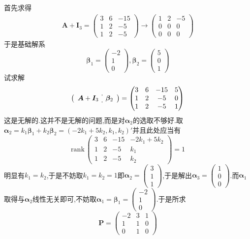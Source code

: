 \begin{brown}
\begin{solution}
        首先求得\begin{align*}
            \bm{A}+\bm{I}_3=\begin{pmatrix}
                3&6&-15\\1&2&-5\\1&2&-5
            \end{pmatrix}\longrightarrow\begin{pmatrix}
                1&2&-5\\0&0&0\\0&0&0
            \end{pmatrix}
        \end{align*}于是基础解系\[
        \bm{\beta}_1=\begin{pmatrix}
            -2\\1\\0
        \end{pmatrix},\bm{\beta}_2=\begin{pmatrix}
            5\\0\\1
        \end{pmatrix}
        \]试求解\[
        \left(
        \begin{array}{c:c}
            \bm{A}+\bm{I}_3&\bm{\beta}_2
        \end{array}
        \right)=\begin{pmatrix}
            3&6&-15&5\\1&2&-5&0\\1&2&-5&1
        \end{pmatrix}
        \]这是无解的.这并不是无解的问题,而是对$\bm{\alpha}_2$的选取不够好.取$\bm{\alpha}_2=k_1\bm{\beta}_1+k_2\bm{\beta}_2=\left(
            -2k_1+5k_2,k_1,k_2
        \right)'$并且此处应当有\[
        \mathrm{rank}\,\begin{pmatrix}
            3&6&-15&-2k_1+5k_2\\1&2&-5&k_1\\1&2&-5&k_2   
        \end{pmatrix}=1
        \]明显有$k_1=k_2$,于是不妨取$k_1=k_2=1$即$\bm{\alpha}_2=\begin{pmatrix}
            3\\1\\1
            \end{pmatrix}$,于是解出$\bm{\alpha}_3=\begin{pmatrix}
                1\\0\\0
            \end{pmatrix}$.而$\bm{\alpha}_1$取得与$\bm{\alpha}_2$线性无关即可,不妨取$\bm{\alpha}_1=\bm{\beta}_1=\begin{pmatrix}
                -2\\1\\0
            \end{pmatrix}$.于是所求\[
            \bm{P}= \begin{pmatrix}
                -2&3&1\\1&1&0\\0&1&0
            \end{pmatrix}
            \]
    \end{solution}
\end{brown}
